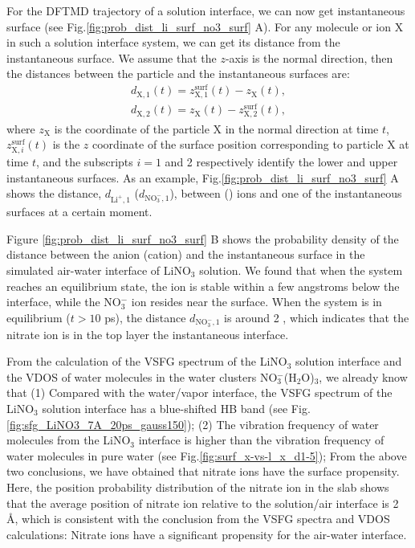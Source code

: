 For the DFTMD trajectory of a solution interface, we can now get instantaneous surface (see Fig.\thinspace\ref{fig:prob_dist_li_surf_no3_surf} A).
For any molecule or ion X in such a solution interface system, we can get its distance from the instantaneous surface.
We assume that the $z$-axis is the normal direction, then the distances between the particle and the instantaneous surfaces are:
%
\begin{eqnarray}
    d_{\text{X},1}(t)=  z^\text{surf}_{\text{X},1}(t) - z_{\text{X}}(t),\label{eq:distance_particle2surf_1}\\
    d_{\text{X},2}(t)= z_{\text{X}}(t) - z^\text{surf}_{\text{X},2}(t), 
\label{eq:distance_particle2surf_2}
\end{eqnarray}
%
where $z_{\text{X}}$ is the coordinate of the particle X in the normal direction at time $t$, 
$z^\text{surf}_{\text{X},i}(t)$ is the $z$ coordinate of the surface position corresponding to particle X at time $t$, 
and the subscripts $i=1$ and 2 respectively identify the lower and upper instantaneous surfaces.
As an example, Fig.\thinspace\ref{fig:prob_dist_li_surf_no3_surf} A shows the distance, 
$d_{\text{Li}^+,1}$ ($d_{\text{NO}_3^-,1}$), between \Li (\nitrate) ions and one of the instantaneous surfaces at a certain moment.

Figure \ref{fig:prob_dist_li_surf_no3_surf} B shows the probability density of the distance between the anion (cation) 
and the instantaneous surface in the simulated air-water interface of LiNO$_3$ solution. We found that when the system reaches an equilibrium state, 
the \Li ion is stable within a few angstroms below the interface, while the NO$^-_3$ ion resides near the surface. 
When the system is in equilibrium ($t>10$ ps), the distance $d_{\text{NO}_3^-,1}$ is around 2 \A, 
which indicates that the nitrate ion is in the top layer the instantaneous interface. 

From the calculation of the VSFG spectrum of the LiNO$_3$ solution interface and the VDOS of water molecules in the water clusters NO$^-_3$(H$_2$O)$_3$,
we already know that (1) Compared with the water/vapor interface, the VSFG spectrum of the LiNO$_3$ solution interface has a blue-shifted HB band 
(see Fig.\thinspace\ref{fig:sfg_LiNO3_7A_20ps_gauss150});
(2) The vibration frequency of water molecules from the LiNO$_3$ interface is higher than the vibration frequency of water molecules in pure water 
(see Fig.\thinspace\ref{fig:surf_x-vs-l_x_d1-5});
From the above two conclusions, we have obtained that nitrate ions have the surface propensity. 
Here, the position probability distribution of the nitrate ion in the slab shows that the average position of nitrate ion relative to the solution/air interface is 2 \AA,
which is consistent with the conclusion from the VSFG spectra and VDOS calculations: Nitrate ions have a significant propensity for the air-water interface.
%
